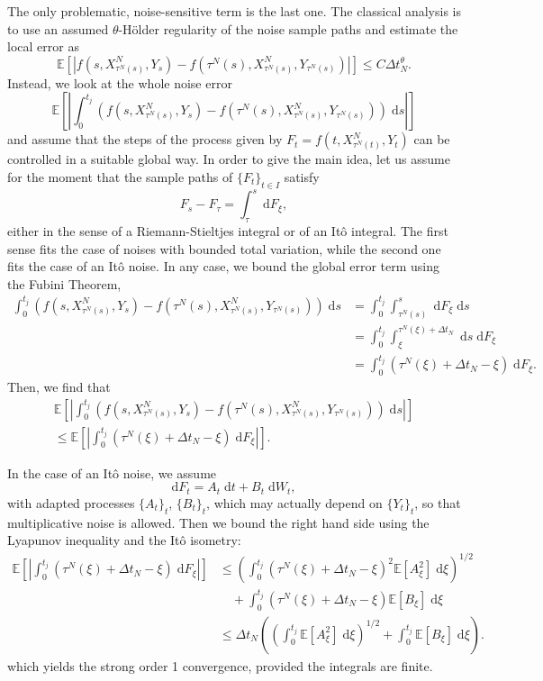 \documentclass[reqno,12pt]{amsart}
\theoremstyle{plain}%
\theoremstyle{definition}
\begin{document}
The only problematic, noise-sensitive term is the last one. The classical analysis is to use an assumed $\theta$-H\"older regularity of the noise sample paths and estimate the local error as
\[
    \mathbb{E}\left[\left|f(s, X_{\tau^N(s)}^N, Y_s) - f(\tau^N(s), X_{\tau^N(s)}^N, Y_{\tau^N(s)})\right|\right] \leq C\Delta t_N^{\theta}.
\]
Instead, we look at the whole noise error 
\[
    \mathbb{E}\left[\left|\int_0^{t_j} \left( f(s, X_{\tau^N(s)}^N, Y_s) - f(\tau^N(s), X_{\tau^N(s)}^N, Y_{\tau^N(s)}) \right)\;\mathrm{d}s\right|\right]
\]
and assume that the steps of the process given by $F_t = f(t, X_{\tau^N(t)}^N, Y_t)$ can be controlled in a suitable global way. In order to give the main idea, let us assume for the moment that the sample paths of $\{F_t\}_{t\in I}$ satisfy
\[
    F_s - F_\tau = \int_\tau^s \;\mathrm{d}F_\xi,
\]
either in the sense of a Riemann-Stieltjes integral or of an It\^o integral. The first sense fits the case of noises with bounded total variation, while the second one fits the case of an It\^o noise. In any case, we bound the global error term using the Fubini Theorem,
\begin{align*}
    \int_0^{t_j} \left( f(s, X_{\tau^N(s)}^N, Y_s) - f(\tau^N(s), X_{\tau^N(s)}^N, Y_{\tau^N(s)}) \right)\;\mathrm{d}s & = \int_0^{t_j} \int_{\tau^N(s)}^s \;\mathrm{d}  F_\xi\;\mathrm{d}s \\
    & = \int_0^{t_j} \int_{\xi}^{\tau^N(\xi) + \Delta t_N} \;\mathrm{d}s \;\mathrm{d} F_\xi \\
    & = \int_0^{t_j} (\tau^N(\xi) + \Delta t_N - \xi) \;\mathrm{d} F_\xi.
\end{align*}
Then, we find that
\begin{multline*}
    \mathbb{E}\left[\left| \int_0^{t_j} \left( f(s, X_{\tau^N(s)}^N, Y_s) - f(\tau^N(s), X_{\tau^N(s)}^N, Y_{\tau^N(s)}) \right)\;\mathrm{d}s\right|\right] \\
    \leq \mathbb{E}\left[\left| \int_0^{t_j} (\tau^N(\xi) + \Delta t_N - \xi) \;\mathrm{d} F_\xi \right|\right].
\end{multline*}

In the case of an It\^o noise, we assume
\[
    \mathrm{d}F_t = A_t\;\mathrm{d}t + B_t\;\mathrm{d}W_t,
\]
with adapted processes $\{A_t\}_t$, $\{B_t\}_t$, which may actually depend on $\{Y_t\}_t$, so that multiplicative noise is allowed. Then we bound the right hand side using the Lyapunov inequality and the It\^o isometry:
\begin{align*}
    \mathbb{E}\left[\left| \int_0^{t_j} (\tau^N(\xi) + \Delta t_N - \xi) \;\mathrm{d} F_\xi \right|\right] & \leq \left( \int_0^{t_j} (\tau^N(\xi) + \Delta t_N - \xi)^2 \mathbb{E}[A_\xi^2]\;\mathrm{d} \xi\right)^{1/2} \\ 
    & \quad + \int_0^{t_j} (\tau^N(\xi) + \Delta t_N - \xi) \mathbb{E}[B_\xi] \;\mathrm{d}\xi  \\ 
    & \leq \Delta t_N\left(\left( \int_0^{t_j} \mathbb{E}[A_\xi^2]\;\mathrm{d} \xi \right)^{1/2} + \int_0^{t_j} \mathbb{E}[B_\xi] \;\mathrm{d}\xi \right).
\end{align*}
which yields the strong order 1 convergence, provided the integrals are finite.
\end{document}

